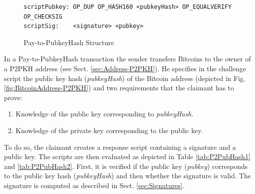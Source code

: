 \vspace{-10pt}
\begin{figure}[ht!]

\begin{Verbatim}[fontsize==\relsize{-4}, frame=single]  
scriptPubkey: OP_DUP OP_HASH160 <pubkeyHash> OP_EQUALVERIFY OP_CHECKSIG
scriptSig:    <signature> <pubkey>	
\end{Verbatim}

\vspace{-15pt}
\caption{Pay-to-PubkeyHash Structure}
\label{fig:P2PubHashStructure}
\end{figure}
\vspace{-10pt}

\noindent
In a Pay-to-PubkeyHash transaction the sender transfers Bitcoins to the owner of a P2PKH address (see Sect. \ref{sec:Address-P2PKH}). He specifies in the challenge script the public key hash (\textit{pubkeyHash}) of the Bitcoin address (depicted in Fig. \ref{fig:BitcoinAddress-P2PKH}) and two requirements that the claimant has to prove:

\begin{enumerate}[label=\arabic*), leftmargin=1cm]
\item Knowledge of the public key corresponding to \textit{pubkeyHash}.
\item Knowledge of the private key corresponding to the public key.
\end{enumerate}

\noindent
To do so, the claimant creates a response script containing a signature and a public key. The scripts are then evaluated as depicted in Table \ref{tab:P2PubHash1} and \ref{tab:P2PubHash2}. First, it is verified if the public key (\textit{pubkey}) corresponds to the public key hash (\textit{pubkeyHash}) and then whether the signature is valid. The signature is computed as described in Sect. \ref{sec:Signatures}.~\\


